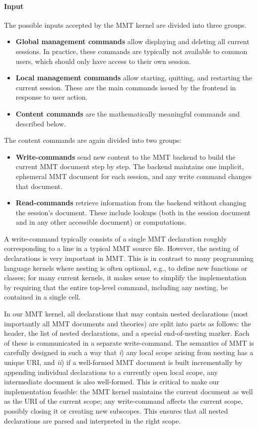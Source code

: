 \paragraph{Input}
The possible inputs accepted by the MMT kernel are divided into three groups.
\begin{itemize}
\item \textbf{Global management commands} allow displaying and deleting all current sessions.
 In practice, these commands are typically not available to common users, which should only have access to their own session.
\item \textbf{Local management commands} allow starting, quitting, and restarting the current session. These are the main commands issued by the frontend in response to user action.
\item \textbf{Content commands} are the mathematically meaningful commands and described below.
\end{itemize}

The content commands are again divided into two groups:
\begin{itemize}
 \item \textbf{Write-commands} send new content to the MMT backend to build the current MMT document step by step.
   The backend maintains one implicit, ephemeral MMT document for each session, and any write command changes that document.
 \item \textbf{Read-commands} retrieve information from the backend without changing the session's document.
   These include lookups (both in the session document and in any other accessible document) or computations.
\end{itemize}

A write-command typically consists of a single MMT declaration roughly corresponding to a line in a typical MMT source file.
However, the nesting of declarations is very important in MMT.
This is in contrast to many programming language kernels where nesting is often optional, e.g., to define new functions or classes;
for many current kernels, it makes sense to simplify the implementation by requiring that the entire top-level command, including any nesting, be contained in a single cell.

In our MMT kernel, all declarations that may contain nested declarations (most importantly all MMT documents and theories) are split into parts as follows: the header, the list of nested declarations, and a special end-of-nesting marker.
Each of these is communicated in a separate write-command.
The semantics of MMT is carefully designed in such a way that \emph{i}) any local scope arising from nesting has a unique URI, and \emph{ii}) if a well-formed MMT document is built incrementally by appending individual declarations to a currently open local scope, any intermediate document is also well-formed.
This is critical to make our implementation feasible: the MMT kernel maintains the current document as well as the URI of the current scope; any write-command affects the current scope, possibly closing it or creating new subscopes.
This ensures that all nested declarations are parsed and interpreted in the right scope.

